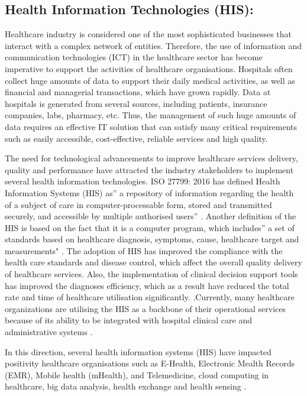 \subsection{Health Information Technologies (HIS):}

Healthcare industry is considered one of the most sophisticated businesses that interact with a complex network of entities. Therefore, the use of information and communication technologies (ICT) in the healthcare sector has become imperative to support the activities of healthcare organisations. Hospitals often collect huge amounts of data to support their daily medical activities, as well as financial and managerial transactions, which have grown rapidly. Data at hospitals is generated from several sources, including patients, insurance companies, labs, pharmacy, etc. Thus, the management of such huge amounts of data requires an effective IT solution that can satisfy many critical requirements such as easily accessible, cost-effective, reliable services and high quality.


The need for technological advancements to improve healthcare services delivery, quality and performance have attracted the industry stakeholders to implement several health information technologies. ISO 27799: 2016 has defined Health Information Systems (HIS) as” a repository of information regarding the health of a subject of care in computer-processable form, stored and transmitted securely, and accessible by multiple authorised users”  \cite{TheInternationalOrganizationforStandardization2016}. Another definition of the HIS is based on the fact that it is a computer program, which includes” a set of standards based on healthcare diagnosis, symptoms, cause, healthcare target and measurements"  \cite{Pai2011}. The adoption of HIS has improved the compliance with the health care standards and disease control, which affect the overall quality delivery of healthcare services. Also, the implementation of clinical decision support tools has improved the diagnoses efficiency, which as a result have reduced the total rate and time of healthcare utilisation significantly. \cite{Care2006,Akowuah2013}.Currently, many healthcare organizations are utilising the HIS as a backbone of their operational services because of its ability to be integrated with hospital clinical care and administrative systems \cite{Rahim2016}.   

In this direction, several health information systems (HIS) have impacted positivity healthcare organisations such as E-Health, Electronic Mealth Records (EMR), Mobile health (mHealth), and Telemedicine, cloud computing in healthcare, big data analysis, health exchange and health sensing  \cite{WorldHealthOrganization2016,Yang2015}. 


